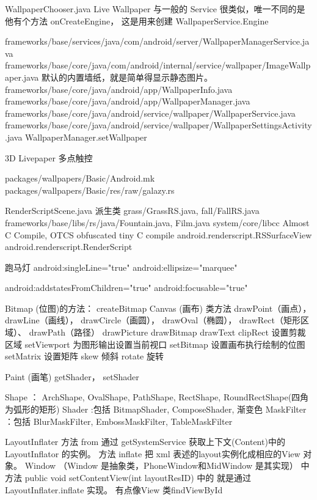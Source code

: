 \documentclass{book}
\begin{document}
\begin{CJK}{UTF8}{gbsn}
WallpaperChooser.java
Live Wallpaper 与一般的 Service 很类似，唯一不同的是他有个方法
onCreateEngine， 这是用来创建 WallpaperService.Engine

frameworks/base/services/java/com/android/server/WallpaperManagerService.java
frameworks/base/core/java/com/android/internal/service/wallpaper/ImageWallpaper.java
默认的内置墙纸，就是简单得显示静态图片。
frameworks/base/core/java/android/app/WallpaperInfo.java
frameworks/base/core/java/android/app/WallpaperManager.java
frameworks/base/core/java/android/service/wallpaper/WallpaperService.java
frameworks/base/core/java/android/service/wallpaper/WallpaperSettingsActivity.java
WallpaperManager.setWallpaper

  3D Livepaper  多点触控

  packages/wallpapers/Basic/Android.mk
  packages/wallpapers/Basic/res/raw/galazy.rs

  RenderScriptScene.java  派生类 grass/GrassRS.java,  fall/FallRS.java
  frameworks/base/libs/rs/java/Fountain.java, Film.java
  system/core/libcc Almost C Compile,  OTCS obfuscated tiny C compile
  android.renderscript.RSSurfaceView
  android.renderscript.RenderScript

跑马灯
android:singleLine="true"
android:ellipsize="marquee"

android:addstatesFromChildren="true"
android:focusable="true"


Bitmap (位图)的方法：   createBitmap
Canvas (画布) 类方法 drawPoint（画点），
                     drawLine（画线）， 
                     drawCircle（画圆），
                     drawOval（椭圆），
                     drawRect（矩形区域）、 
                     drawPath（路径）
                     drawPicture
                     drawBitmap
                     drawText
                     clipRect 设置剪裁区域
                     setViewport 为图形输出设置当前视口
                     setBitmap   设置画布执行绘制的位图
                     setMatrix   设置矩阵
                     skew 倾斜
                     rotate 旋转

Paint (画笔)   getShader， setShader

Shape ：  ArchShape,   OvalShape,   PathShape,   RectShape,  RoundRectShape(四角为弧形的矩形)
Shader :包括 BitmapShader, ComposeShader,    渐变色
MaskFilter ：包括 BlurMaskFilter, EmbossMaskFilter,   TableMaskFilter

LayoutInflater  方法 from 通过 getSystemService 获取上下文(Content)中的 LayoutInflator 的实例。
方法 inflate 把 xml 表述的layout实例化成相应的View 对象。
Window （Window 是抽象类，PhoneWindow和MidWindow 是其实现） 中 方法
  public void setContentView(int layoutResID) 中的 就是通过 LayoutInflater.inflate 实现。
 有点像View 类findViewById 



\end{CJK}
\end{document}
